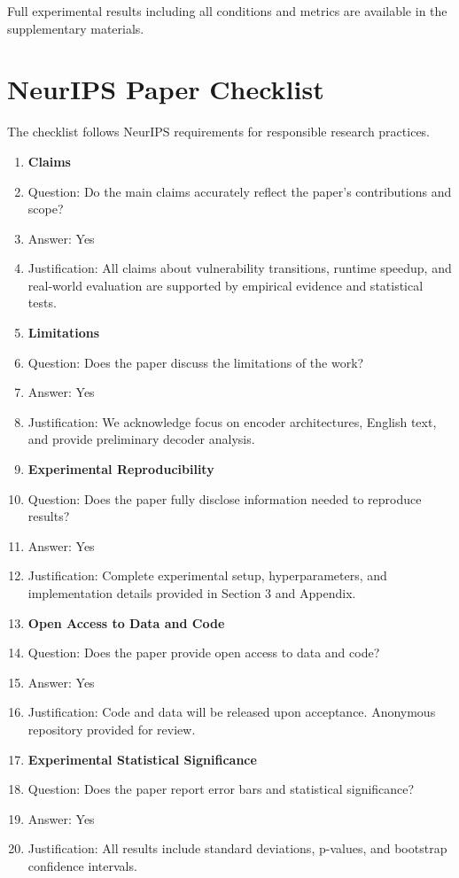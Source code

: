 \documentclass{article}
\begin{document}
Full experimental results including all conditions and metrics are available in the supplementary materials.

\newpage

\section*{NeurIPS Paper Checklist}

The checklist follows NeurIPS requirements for responsible research practices.

\begin{enumerate}

\item {\bf Claims}
    \item[] Question: Do the main claims accurately reflect the paper's contributions and scope?
    \item[] Answer: Yes
    \item[] Justification: All claims about vulnerability transitions, runtime speedup, and real-world evaluation are supported by empirical evidence and statistical tests.

\item {\bf Limitations}
    \item[] Question: Does the paper discuss the limitations of the work?
    \item[] Answer: Yes
    \item[] Justification: We acknowledge focus on encoder architectures, English text, and provide preliminary decoder analysis.

\item {\bf Experimental Reproducibility}
    \item[] Question: Does the paper fully disclose information needed to reproduce results?
    \item[] Answer: Yes
    \item[] Justification: Complete experimental setup, hyperparameters, and implementation details provided in Section 3 and Appendix.

\item {\bf Open Access to Data and Code}
    \item[] Question: Does the paper provide open access to data and code?
    \item[] Answer: Yes
    \item[] Justification: Code and data will be released upon acceptance. Anonymous repository provided for review.

\item {\bf Experimental Statistical Significance}
    \item[] Question: Does the paper report error bars and statistical significance?
    \item[] Answer: Yes
    \item[] Justification: All results include standard deviations, p-values, and bootstrap confidence intervals.


\end{enumerate}
\end{document}
